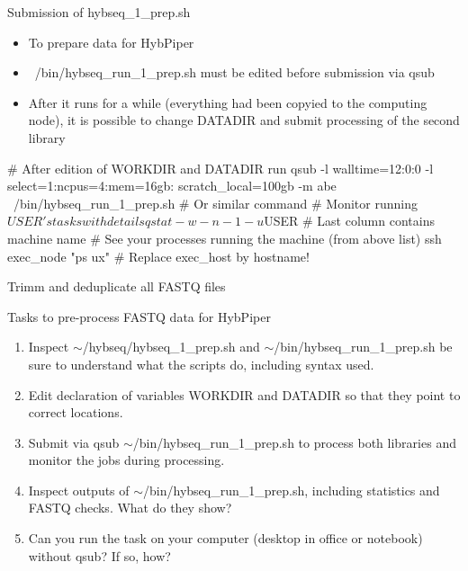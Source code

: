 \documentclass[compress, ucs, xelatex, 11pt, xcolor=x11names, aspectratio=1609,
	hyperref={
		bookmarks=true,
		unicode=true,
		colorlinks=true,
		pdftitle={HybSeq course},
		plainpages=false,
		pdfauthor={Vojtech Zeisek},
		pdfsubject={Practical processing of HybSeq target enrichment sequencing data on computing grids like MetaCentrum},
		pdfcreator={XeLaTeX},
		pdfkeywords={BASH, command line, GNU, HybSeq, Linux, MetaCentrum, sequencing shell, target enrichment},
		linkcolor=Cyan2, %
		anchorcolor=Firebrick2, %
		citecolor=Firebrick2, %
		filecolor=Firebrick2, %
		menucolor=Firebrick2, %
		urlcolor=Chartreuse2, %
		pdftex},
	url={hyphens, lowtilde} %
	]{beamer}
\renewcommand{\texttt}[1]{\colorbox{Snow4}{{\ttfamily #1}}}
\renewcommand{\alert}[1]{\textcolor{OrangeRed2}{#1}}
\begin{document}
\begin{frame}[fragile]{Submission of hybseq\_1\_prep.sh}
	\begin{itemize}
		\item To prepare data for HybPiper
		\item \alert{\texttt{~/bin/hybseq\_run\_1\_prep.sh} must be edited before submission via \texttt{qsub}}
		\item After it runs for a while (everything had been copyied to the computing node), it is possible to change \texttt{DATADIR} and submit processing of the second library
	\end{itemize}
	\begin{bashcode}
    # After edition of WORKDIR and DATADIR run
    qsub -l walltime=12:0:0 -l select=1:ncpus=4:mem=16gb:
      scratch_local=100gb -m abe ~/bin/hybseq_run_1_prep.sh
    # Or similar command
    # Monitor running $USER's tasks with details
    qstat -w -n -1 -u $USER # Last column contains machine name
    # See your processes running the machine (from above list)
    ssh exec_node "ps ux" # Replace exec_host by hostname!
	\end{bashcode}
\end{frame}

\begin{frame}{Trimm and deduplicate all FASTQ files}
	\begin{exampleblock}{Tasks to pre-process FASTQ data for HybPiper}
			\begin{enumerate}
		\item Inspect \texttt{$\sim$/hybseq/hybseq\_1\_prep.sh} and \texttt{$\sim$/bin/hybseq\_run\_1\_prep.sh} be sure to understand what the scripts do, including syntax used.
		\item Edit declaration of variables \texttt{WORKDIR} and \texttt{DATADIR} so that they point to correct locations.
		\item Submit via \texttt{qsub} \texttt{$\sim$/bin/hybseq\_run\_1\_prep.sh} to process both libraries and monitor the jobs during processing.
		\item Inspect outputs of \texttt{$\sim$/bin/hybseq\_run\_1\_prep.sh}, including statistics and FASTQ checks. What do they show?
		\item Can you run the task on your computer (desktop in office or notebook) without \texttt{qsub}? If so, how?
		\end{enumerate}
	\end{exampleblock}
\end{frame}
\end{document}
